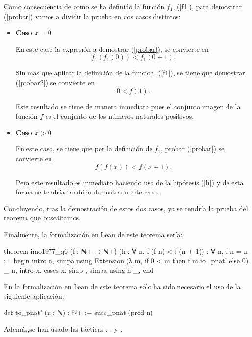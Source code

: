 \begin{demostracion}
  Como consecuencia de como se ha definido la función \(f_1\),
  (\ref{f1}), para demostrar (\ref{probar}) vamos a dividir la prueba en
  dos casos distintos:
  \begin{itemize}
  \item \textbf{Caso \(x=0\)}

    En este caso la expresión a demostrar (\ref{probar}), se convierte
    en
    \begin{equation}\label{probar2}
      f_1(f_1(0)) < f_1(0+1).
    \end{equation}

    Sin más que aplicar la definición de la función, (\ref{f1}), se
    tiene que demostrar (\ref{probar2}) se convierte en
    \begin{equation}
      0 < f(1).
    \end{equation}

    Este resultado se tiene de manera inmediata pues el conjunto imagen
    de la función \(f\) es el conjunto de los números naturales
    positivos.

  \item \textbf{Caso \(x>0\)}

    En este caso, se tiene que por la definición de \(f_1\), probar
    (\ref{probar}) se convierte en
    \begin{equation}\label{probar3}
    f(f(x)) < f(x+1).
    \end{equation}

    Pero este resultado es inmediato haciendo uso de la hipótesis
    (\ref{h}) y de esta forma se tendría también demostrado este caso.
  \end{itemize}

  Concluyendo, tras la demostración de estos dos casos, ya se tendría
  la prueba del teorema que buscábamos.
\end{demostracion}

Finalmente, la formalización en Lean de este teorema sería:
\begin{leancode}
theorem imo1977_q6
  (f : ℕ+ → ℕ+)
  (h : ∀ n, f (f n) < f (n + 1))
  : ∀ n, f n = n :=
begin
  intro n,
  simpa using Extension (λ m, if 0 < m then f m.to_pnat' else 0) _ n,
  intro x,
  cases x,
  { simp },
  { simpa using h _},
end
\end{leancode}

En la formalización en Lean de este teorema sólo ha sido necesario el
uso de la siguiente aplicación:
\begin{leancode}
def to_pnat' (n : ℕ) : ℕ+ := succ_pnat (pred n)
\end{leancode}
Además,se han usado las tácticas
,
,
 y
.

